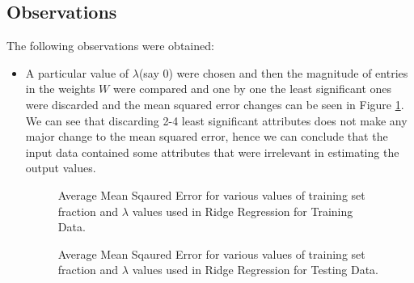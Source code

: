 \documentclass{article}
\begin{document}
\subsection*{Observations}
The following observations were obtained:
\begin{itemize}

\begin{figure}[H]
 \caption{Mean Squared Error for the data after discarding increasing number of least significant weights in $W$.}
 \label{fig:1}
 \end{figure}
 
\item A particular value of $\lambda$(say $0$) were chosen and then the magnitude of entries in the weights $W$ were compared and one by one the least significant ones were discarded and the mean squared error changes can be seen in Figure \ref{fig:1}. We can see that discarding 2-4 least significant attributes does not make any major change to the mean squared error, hence we can conclude that the input data contained some attributes that were irrelevant in estimating the output values.

\begin{figure}[H]
 \caption{Average Mean Sqaured Error for various values of training set fraction and $\lambda$ values used in Ridge Regression for Training Data.}
 \label{fig:2}
 \end{figure}

 \begin{figure}[H]
 \caption{Average Mean Sqaured Error for various values of training set fraction and $\lambda$ values used in Ridge Regression for Testing Data.}
 \label{fig:3}
 \end{figure}


\end{itemize}
\end{document}
